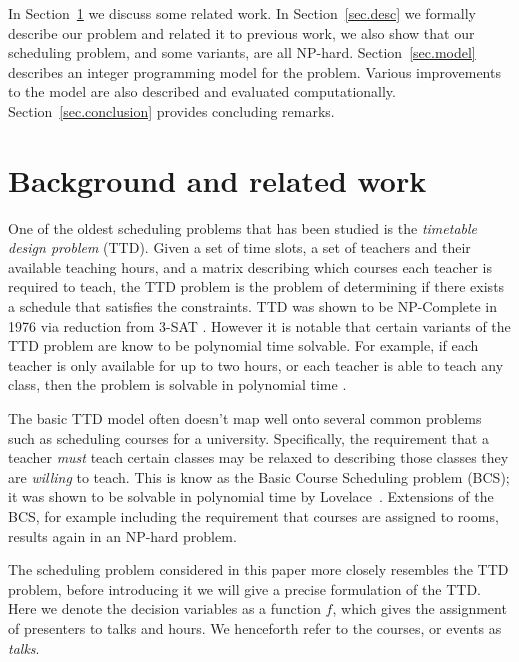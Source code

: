 \documentclass{svjour3}                     %
\begin{document}
In Section~\ref{sec.back} we discuss some related work.
In Section~\ref{sec.desc} we formally describe our problem and related it to previous work,
we also show that our scheduling problem, and some variants, are all NP-hard.
Section~\ref{sec.model} describes an integer programming model for the problem.
Various improvements to the model are also described and evaluated computationally.
Section~\ref{sec.conclusion} provides concluding remarks.

\section{Background and related work}\label{sec.back}

One of the oldest scheduling problems that has been studied is the \emph{timetable design problem} (TTD). 
Given a set of time slots, a set of teachers and their available teaching hours, and a matrix describing which courses each teacher is required to teach,  the TTD problem is the problem of determining if there exists a schedule that satisfies the constraints. 
TTD was shown to be NP-Complete in 1976 via reduction from 3-SAT \cite{even76}. 
However it is notable that certain variants of the TTD problem are know to be polynomial time solvable. 
For example, if each teacher is only available for up to two hours, or each teacher is able to teach any class, then the problem is solvable in polynomial time \cite{garey76}.

The basic TTD model often doesn't map well onto several common problems such as scheduling courses for a university. 
Specifically, the requirement that a teacher \emph{must} teach certain classes may be relaxed to describing those classes they are \emph{willing} to teach. 
This is know as the Basic Course Scheduling problem (BCS); it was shown to be solvable in polynomial time by Lovelace~\cite{lovelace2010}. 
Extensions of the BCS, for example including the requirement that courses are assigned to rooms, results again in an NP-hard problem.

The scheduling problem considered in this paper more closely resembles the TTD problem, before introducing it we will give a precise formulation of the TTD.
Here we denote the decision variables as a function $f$, which gives the assignment of presenters to talks and hours.
We henceforth refer to the courses, or events as \emph{talks}.
\end{document}
